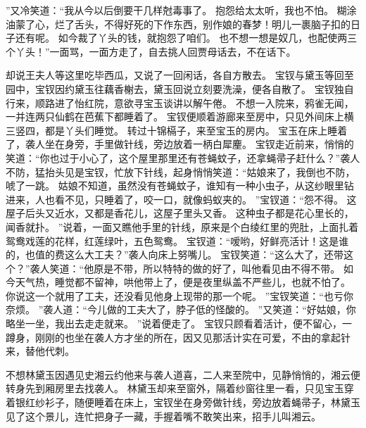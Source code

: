 ”又冷笑道：“我从今以后倒要干几样尅毒事了。
抱怨给太太听，我也不怕。
糊涂油蒙了心，烂了舌头，不得好死的下作东西，别作娘的春梦！明儿一裹脑子扣的日子还有呢。
如今裁了丫头的钱，就抱怨了咱们。
也不想一想是奴几，也配使两三个丫头！”一面骂，一面方走了，自去挑人回贾母话去，不在话下。
\par
却说王夫人等这里吃毕西瓜，又说了一回闲话，各自方散去。
宝钗与黛玉等回至园中，宝钗因约黛玉往藕香榭去，黛玉回说立刻要洗澡，便各自散了。
宝钗独自行来，顺路进了怡红院，意欲寻宝玉谈讲以解午倦。
不想一入院来，鸦雀无闻，一并连两只仙鹤在芭蕉下都睡着了。
宝钗便顺着游廊来至房中，只见外间床上横三竖四，都是丫头们睡觉。
转过十锦槅子，来至宝玉的房内。
宝玉在床上睡着了，袭人坐在身旁，手里做针线，旁边放着一柄白犀麈。
宝钗走近前来，悄悄的笑道：“你也过于小心了，这个屋里那里还有苍蝇蚊子，还拿蝇帚子赶什么？”袭人不防，猛抬头见是宝钗，忙放下针线，起身悄悄笑道：“姑娘来了，我倒也不防，唬了一跳。
姑娘不知道，虽然没有苍蝇蚊子，谁知有一种小虫子，从这纱眼里钻进来，人也看不见，只睡着了，咬一口，就像蚂蚁夹的。
”宝钗道：“怨不得。
这屋子后头又近水，又都是香花儿，这屋子里头又香。
这种虫子都是花心里长的，闻香就扑。
”说着，一面又瞧他手里的针线，原来是个白绫红里的兜肚，上面扎着鸳鸯戏莲的花样，红莲绿叶，五色鸳鸯。
宝钗道：“嗳哟，好鲜亮活计！这是谁的，也值的费这么大工夫？”袭人向床上努嘴儿。
宝钗笑道：“这么大了，还带这个？”袭人笑道：“他原是不带，所以特特的做的好了，叫他看见由不得不带。
如今天气热，睡觉都不留神，哄他带上了，便是夜里纵盖不严些儿，也就不怕了。
你说这一个就用了工夫，还没看见他身上现带的那一个呢。
”宝钗笑道：“也亏你奈烦。
”袭人道：“今儿做的工夫大了，脖子低的怪酸的。
”又笑道：“好姑娘，你略坐一坐，我出去走走就来。
”说着便走了。
宝钗只顾看着活计，便不留心，一蹲身，刚刚的也坐在袭人方才坐的所在，因又见那活计实在可爱，不由的拿起针来，替他代刺。
\par
不想林黛玉因遇见史湘云约他来与袭人道喜，二人来至院中，见静悄悄的，湘云便转身先到厢房里去找袭人。
林黛玉却来至窗外，隔着纱窗往里一看，只见宝玉穿着银红纱衫子，随便睡着在床上，宝钗坐在身旁做针线，旁边放着蝇帚子，林黛玉见了这个景儿，连忙把身子一藏，手握着嘴不敢笑出来，招手儿叫湘云。
